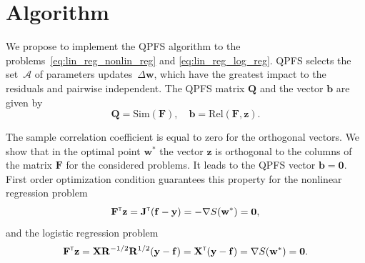 \documentclass[a4paper,12pt]{article}
\theoremstyle{plain} %
\theoremstyle{definition} %
\theoremstyle{remark} %
\newcommand{\bb}{\mathbf{b}}
\newcommand{\bw}{\mathbf{w}}
\newcommand{\by}{\mathbf{y}}
\newcommand{\bz}{\mathbf{z}}
\newcommand{\cA}{\mathcal{A}}
\newcommand{\bJ}{\mathbf{J}}
\newcommand{\bQ}{\mathbf{Q}}
\newcommand{\bF}{\mathbf{F}}
\newcommand{\bR}{\mathbf{R}}
\newcommand{\bX}{\mathbf{X}}
\newcommand{\T}{{\text{\tiny\sffamily\upshape\mdseries T}}}
\begin{document}
	\section*{Algorithm}
	We propose to implement the QPFS algorithm to the problems~\eqref{eq:lin_reg_nonlin_reg} and \eqref{eq:lin_reg_log_reg}. 
	QPFS selects the set~$\cA$ of parameters updates~$\Delta \bw$, which have the greatest impact to the residuals and pairwise independent.
	The QPFS matrix $\bQ$ and the vector $\bb$ are given by
	\[
		\bQ = \text{Sim} (\bF), \quad \bb = \text{Rel} (\bF, \bz).
	\]
	
	The sample correlation coefficient is equal to zero for the orthogonal vectors.
	We show that in the optimal point $\bw^*$ the vector $\bz$ is orthogonal to the columns of the matrix $\bF$ for the considered problems. 
	It leads to the QPFS vector $\bb = \boldsymbol{0}$.
	First order optimization condition guarantees this property for the nonlinear regression problem
	\[
	\bF^{\T} \bz = \bJ^{\T} (\mathbf{f} - \by) = - \nabla S(\bw^*) = \boldsymbol{0},
	\]
	and the logistic regression problem
	\[
	\bF^{\T} \bz = \bX \bR^{-1/2} \bR^{1/2} (\by - \mathbf{f}) = \bX^{\T} (\by - \mathbf{f}) = \nabla S(\bw^*) = \boldsymbol{0}.
	\]
	
\end{document}
